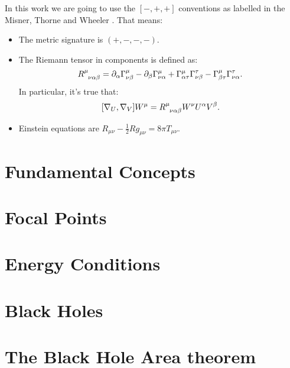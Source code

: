 \documentclass[12pt, a4paper]{book}
\begin{document}
In this work we are going to use the \([-, + , +]\) conventions as labelled in the Misner, Thorne and Wheeler \cite{misner1973gravitation}. That means:
\begin{itemize}
	\item[\ding{99}] The metric signature is \((+, -, -, -)\).
	\item[\ding{99}]  The Riemann tensor in components is defined as:
	\[
	R\indices{^{\mu}_{\nu\alpha\beta}} = \partial_{\alpha}\Gamma^{\mu}_{\nu\beta} - \partial_{\beta}\Gamma^{\mu}_{\nu\alpha} + \Gamma^{\mu}_{\alpha\tau}\Gamma^{\tau}_{\nu\beta} - \Gamma^{\mu}_{\beta\tau}\Gamma^{\tau}_{\nu\alpha}.
	\]
	In particular, it's true that:
	\[
	[\nabla_U, \nabla_V] W^{\mu} = R\indices{^{\mu}_{\nu\alpha\beta}}W^{\nu}U^{\alpha}V^{\beta}.
	\]
	\item[\ding{99}]  Einstein equations are \(R_{\mu\nu} - \frac{1}{2}Rg_{\mu\nu} = 8\pi T_{\mu\nu}\).
\end{itemize}


\chapter{Fundamental Concepts}


\chapter{Focal Points}
\label{ch:focal-points}


\chapter{Energy Conditions}
\label{ch:energy-conditions}


\chapter{Black Holes}


\chapter{The Black Hole Area theorem}

\end{document}
